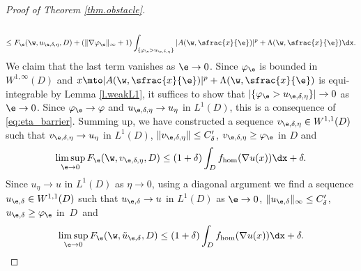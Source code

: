 \begin{proof}[Proof of Theorem \ref{thm.obstacle}]
\begin{multline*}
\\
\leq  F_{\e}(\w,u_{\e,\delta,\eta},D)+(\|\nabla\varphi_{\e}\|_{\infty}+1)\int_{\{\varphi_{\e}> u_{\e,\delta,\eta}\}}|A(\w,\sfrac{x}{\e})|^p+\Lambda(\w,\sfrac{x}{\e})\dx.
\end{multline*}
We claim that the last term vanishes as $\e\to 0$. Since $\varphi_{\e}$ is bounded in $W^{1,\infty}(D)$ and $x\mto |A(\w,\sfrac{x}{\e})|^p+\Lambda(\w,\sfrac{x}{\e})$ is equi-integrable by Lemma \ref{l.weakL1}, it suffices to show that $|\{\varphi_{\e}>u_{\e,\delta,\eta}\}|\to 0$ as $\e\to 0$. Since $\varphi_{\e}\to\varphi$ and $u_{\e,\delta,\eta}\to u_{\eta}$ in $L^1(D)$, this is a consequence of \eqref{eq:eta_barrier}. Summing up, we have constructed a sequence $v_{\e,\delta,\eta}\in W^{1,1}(D)$ such that $v_{\e,\delta,\eta}\to u_{\eta}$ in $L^1(D)$, $\|v_{\e,\delta,\eta}\|\leq C'_\delta$, $v_{\e,\delta,\eta}\geq\varphi_{\e}$ in $D$ and\vspace*{-3pt}
\begin{equation*}
\limsup_{\e\to 0}F_{\e}(\w,v_{\e,\delta,\eta},D)\leq (1+\delta)\int_D f_{\hom}(\nabla u(x))\dx+\delta.
\end{equation*}
Since $u_{\eta}\to u$ in $L^1(D)$ as $\eta\to 0$, using a diagonal argument we find a sequence ${u}_{\e,\delta}\in W^{1,1}(D)$ such that $u_{\e,\delta}\to u$ in $L^1(D)$ as $\e\to 0$, $\|u_{\e,\delta}\|_{\infty}\leq C'_\delta$, $u_{\e,\delta}\geq\varphi_{\e}$ in~$D$~and
\begin{equation*}
\limsup_{\e\to 0}F_{\e}(\w,\tilde{u}_{\e,\delta},D)\leq (1+\delta)\int_D f_{\hom}(\nabla u(x))\dx+\delta.
\end{equation*}


\end{proof}
